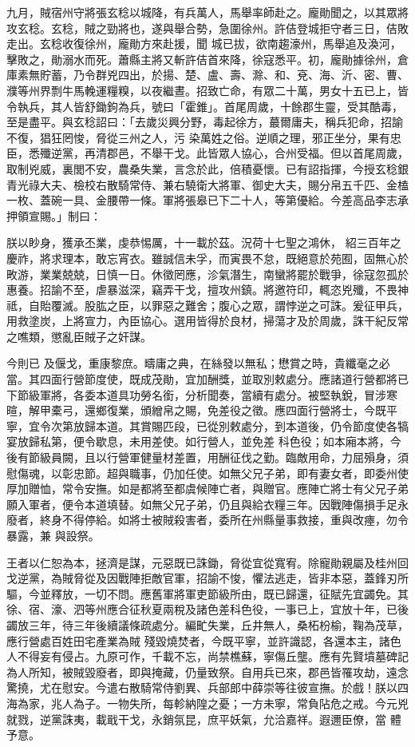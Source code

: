 \begin{pinyinscope}
 九月，賊宿州守將張玄稔以城降，有兵萬人，馬舉率師赴之。龐勛聞之，以其眾將攻玄稔。玄稔，賊之勁將也，遂與舉合勢，急圍徐州。許佶登城拒守者三日，佶敗走出。玄稔收復徐州，龐勛方來赴援，聞
 城已拔，欲南趨濠州，馬舉追及渙河，擊敗之，勛溺水而死。蕭縣主將又斬許佶首來降，徐寇悉平。初，龐勛據徐州，倉庫素無貯蓄，乃令群兇四出，於揚、楚、盧、壽、滁、和、兗、海、沂、密、曹、濮等州界剽牛馬輓運糧糗，以夜繼晝。招致亡命，有眾二十萬，男女十五已上，皆令執兵，其人皆舒鋤鉤為兵，號曰「霍錐」。首尾周歲，十餘郡生靈，受其酷毒，至是盡平。與玄稔詔曰：「去歲災興分野，毒起徐方，蕞爾庸夫，稱兵犯命，招諭不復，猖狂罔悛，脅從三州之人，污
 染萬姓之俗。逆順之理，邪正坐分，果有忠臣，悉殲逆黨，再清郡邑，不舉干戈。此皆眾人協心，合州受福。但以首尾周歲，取制兇威，裏閭不安，農桑失業，言念於此，倍積憂懷。已有詔指揮，今授玄稔銀青光祿大夫、檢校右散騎常侍、兼右驍衛大將軍、御史大夫，賜分帛五千匹、金榼一枚、蓋碗一具、金腰帶一條。軍將張皋已下二十人，等第優給。今差高品李志承押領宣賜。」制曰：



 朕以眇身，獲承丕業，虔恭惕厲，十一載於茲。況荷十七聖之鴻休，
 紹三百年之慶祚，將求理本，敢忘宵衣。雖誠信未孚，而寅畏不怠，既絕意於苑囿，固無心於畋游，業業兢兢，日慎一日。休徵罔應，沴氣潛生，南蠻將罷於戰爭，徐寇忽孤於惠養。招諭不至，虐暴滋深，竊弄干戈，擅攻州鎮。將邀符印，輒恣兇殲，不畏神祗，自貽覆滅。股肱之臣，以罪惡之難舍；腹心之眾，謂悖逆之可誅。爰征甲兵，用救塗炭，上將宣力，內臣協心。選用皆得於良材，掃蕩才及於周歲，誅干紀反常之噍類，懲亂臣賊子之奸謀。



 今則已
 及偃戈，重康黎庶。疇庸之典，在絲發以無私；懋賞之時，貴纖毫之必當。其四面行營節度使，既成茂勛，宜加酬獎，並取別敕處分。應諸道行營都將已下節級軍將，各委本道具功勞名銜，分析聞奏，當續有處分。被堅執銳，冒涉寒暄，解甲橐弓，還鄉復業，頒繒帛之賜，免差役之徵。應四面行營將士，今既平寧，宜令次第放歸本道。其賞賜匹段，已從別敕處分，到本道後，仍令節度使各犒宴放歸私第，便令歇息，未用差使。如行營人，並免差
 科色役；如本廂本將，今後有節級員闕，且以行營軍健量材差置，用酬征伐之勤。臨敵用命，力屈殞身，須慰傷魂，以彰忠節。超與職事，仍加任使。如無父兄子弟，即有妻女者，即委州使厚加贈恤，常令安撫。如是都將至都虞候陣亡者，與贈官。應陣亡將士有父兄子弟願入軍者，便令本道填替。如無父兄子弟，仍且與給衣糧三年。因戰陣傷損手足永廢者，終身不得停給。如將士被賊殺害者，委所在州縣量事救接，重與改瘞，勿令暴露，兼
 與設祭。



 王者以仁恕為本，拯濟是謀，元惡既已誅鋤，脅從宜從寬宥。除寵勛親屬及桂州回戈逆黨，為賊脅從及因戰陣拒敵官軍，招諭不悛，懼法逃走，皆非本惡，蓋鋒刃所驅，今並釋放，一切不問。應舊軍將軍吏節級所由，既已歸還，征賦先宜蠲免。其徐、宿、濠、泗等州應合征秋夏兩稅及諸色差科色役，一事已上，宜放十年，已後蠲放三年，待三年後續議條疏處分。編甿失業，丘井無人，桑柘枌榆，鞠為茂草，應行營處百姓田宅產業為賊
 殘毀燒焚者，今既平寧，並許識認，各還本主，諸色人不得妄有侵占。九原可作，千載不忘，尚禁樵蘇，寧傷丘壟。應有先賢墳墓碑記為人所知，被賊毀廢者，即與掩藏，仍量致祭。自用兵已來，郡邑皆罹攻劫，遠念驚撓，尤在慰安。今遣右散騎常侍劉異、兵部郎中薛崇等往彼宣撫。於戲！朕以四海為家，兆人為子。一物失所，每軫納隍之憂；一方未寧，常負阽危之戒。今元兇就戮，逆黨誅夷，載戢干戈，永銷氛昆，庶平妖氣，允洽嘉祥。遐邇臣僚，當
 體予意。




\end{pinyinscope}
